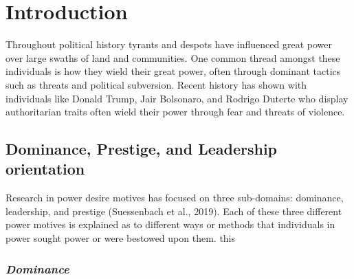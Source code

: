 \documentclass[
  english,
  ,doc, 12pt, a4paper,floatsintext]{apa7}
\begin{document}
\mbox{}\thispagestyle{empty}\clearpage
\bigskip

\hypertarget{introduction}{%
\section{Introduction}\label{introduction}}

Throughout political history tyrants and despots have influenced great power over large swaths of land and communities. One common thread amongst these individuals is how they wield their great power, often through dominant tactics such as threats and political subversion. Recent history has shown with individuals like Donald Trump, Jair Bolsonaro, and Rodrigo Duterte who display authoritarian traits often wield their power through fear and threats of violence.

\hypertarget{dominance-prestige-and-leadership-orientation}{%
\subsection{Dominance, Prestige, and Leadership orientation}\label{dominance-prestige-and-leadership-orientation}}

Research in power desire motives has focused on three sub-domains: dominance, leadership, and prestige (Suessenbach et al., 2019). Each of these three different power motives is explained as to different ways or methods that individuals in power sought power or were bestowed upon them. this

\hypertarget{dominance}{%
\subsubsection{\texorpdfstring{\emph{Dominance}}{Dominance}}\label{dominance}}
\end{document}
